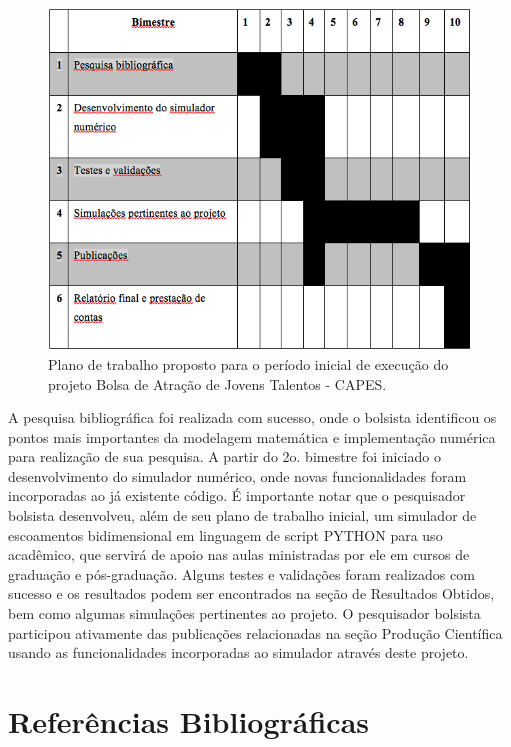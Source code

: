 \documentclass[a4paper,portuges,12pt]{article}
\begin{document}
 \begin{figure}[ht!]
 	\begin{center}
 		\includegraphics[angle=0, scale=0.5]{figs/plano.png}
 	\end{center}
 	\caption{Plano de trabalho proposto para o período inicial de
	execução do projeto Bolsa de Atração de Jovens Talentos - CAPES.}
 	\label{fig:plano} 
 \end{figure}

A pesquisa bibliográfica foi realizada com sucesso, onde o bolsista
identificou os pontos mais importantes da modelagem matemática e
implementação numérica para realização de sua pesquisa. A partir do 2o.
bimestre foi iniciado o desenvolvimento do simulador numérico, onde
novas funcionalidades foram incorporadas ao já existente código. É
importante notar que o pesquisador bolsista desenvolveu, além de seu
plano de trabalho inicial, um simulador de escoamentos bidimensional em
linguagem de script PYTHON para uso acadêmico, que servirá de apoio nas
aulas ministradas por ele em cursos de graduação e pós-graduação. Alguns
testes e validações foram realizados com sucesso e os resultados podem
ser encontrados na seção de Resultados Obtidos, bem como algumas
simulações pertinentes ao projeto. O pesquisador bolsista participou
ativamente das publicações relacionadas na seção Produção Científica
usando as funcionalidades incorporadas ao simulador através deste
projeto.

\section{Referências Bibliográficas}


\end{document}
